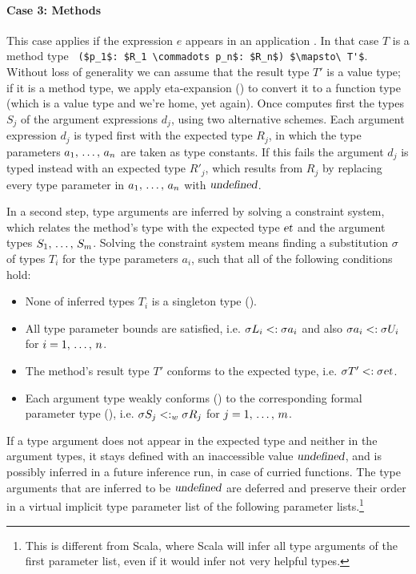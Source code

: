 \paragraph{Case 3: Methods}
This case applies if the expression $e$ appears in an application . In that case $T$ is a method type ~\lstinline!($p_1$: $R_1 \commadots p_n$: $R_n$) $\mapsto\ T'$!. Without loss of generality we can assume that the result type $T'$ is a value type; if it is a method type, we apply eta-expansion () to convert it to a function type (which is a value type and we're home, yet again). Once computes first the types $S_j$ of the argument expressions $d_j$, using two alternative schemes. Each argument expression $d_j$ is typed first with the expected type $R_j$, in which the type parameters $a_1 ,\, \ldots ,\, a_n$ are taken as type constants. If this fails the argument $d_j$ is typed instead with an expected type $R'_j$, which results from $R_j$ by replacing every type parameter in $a_1 ,\, \ldots ,\, a_n$ with $\mbox{\sl undefined}$. 

In a second step, type arguments are inferred by solving a constraint system, which relates the method's type with the expected type $\mbox{\sl et}$ and the argument types $S_1 ,\, \ldots ,\, S_m$. Solving the constraint system means finding a substitution $\sigma$ of types $T_i$ for the type parameters $a_i$, such that all of the following conditions hold:
\begin{itemize}
\item None of inferred types $T_i$ is a singleton type (). %
\item All type parameter bounds are satisfied, i.e. $\sigma L_i <: \sigma a_i$ and also $\sigma a_i <: \sigma U_i$ for $i = 1 ,\, \ldots ,\, n$. 
\item The method's result type $T'$ conforms to the expected type, i.e. $\sigma T' <: \sigma \mbox{\sl et}$. 
\item Each argument type weakly conforms () to the corresponding formal parameter type (), i.e. $\sigma S_j <: _w \sigma R_j$ for $j = 1 ,\, \ldots ,\, m$. 
\end{itemize}

If a type argument does not appear in the expected type and neither in the argument types, it stays defined with an inaccessible value $\mbox{\sl undefined}$, and is possibly inferred in a future inference run, in case of curried functions. The type arguments that are inferred to be $\mbox{\sl undefined}$ are deferred and preserve their order in a virtual implicit type parameter list of the following parameter lists.\footnote{This is different from Scala, where Scala will infer all type arguments of the first parameter list, even if it would infer not very helpful types.}

